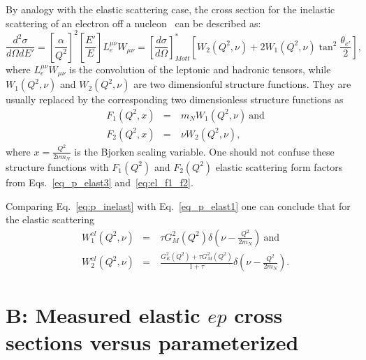 By analogy with the elastic scattering case, the cross section for the inelastic scattering of an electron off a nucleon~\cite{Halzen:1984mc,Close:1979bt,Povh:1995mua} can be described as:
\begin{equation}
\frac{d^{2}\sigma}{d\Omega d E'} = \left [\frac{\alpha}{Q^2}\right ]^{2} \left [\frac{E'}{E}\right ] L_{e}^{\mu \nu}W_{\mu \nu} =  \left [ \frac{d\sigma}{d\Omega} \right ]^{*}_{Mott}   \left [ W_{2}(Q^{2},\nu) + 2W_{1}(Q^{2},\nu)\tan^{2}{\frac{\theta_{e'}}{2}} \right ],\label{eq:p_inelast}
\end{equation}
where $L_{e}^{\mu \nu}W_{\mu \nu}$ is the convolution of the leptonic and hadronic tensors, while $W_{1}(Q^{2},\nu)$ and $W_{2}(Q^{2},\nu)$ are two dimensionful structure functions. They are usually replaced by the corresponding two dimensionless structure functions as
\begin{equation}
\begin{aligned}
&F_{1}(Q^{2},x) &=~& m_{N}W_{1}(Q^{2},\nu)~\textrm{and} \\
&F_{2}(Q^{2},x) &=~& \nu W_{2}(Q^{2}, \nu),
\label{eq:dimless_str_f}
\end{aligned}
\end{equation}
where $x=\frac{Q^{2}}{2 \nu m_{N}}$ is the Bjorken scaling variable. One should not confuse these structure functions with $F_{1}(Q^{2})$ and $F_{2}(Q^{2})$ elastic scattering form factors from Eqs.~\eqref{eq_p_elast3} and~\eqref{eq:el_f1_f2}.

Comparing Eq.~\eqref{eq:p_inelast} with Eq.~\eqref{eq_p_elast1} one can conclude that for the elastic scattering~\cite{Close:1979bt} 
\begin{equation}
\begin{aligned}
&W_{1}^{el}(Q^{2},\nu) &=~& \tau G_{M}^{2}(Q^{2})\delta\left ( \nu - \frac{Q^{2}}{2m_{N}} \right)~\textrm{and}  \\
&W_{2}^{el}(Q^{2},\nu) &=~& \frac{G_{E}^{2}(Q^{2}) + \tau G_{M}^{2}(Q^{2}) }{1+\tau} \delta\left ( \nu - \frac{Q^{2}}{2m_{N}} \right).
\label{eq:rel_str_fun}
\end{aligned}
\end{equation}


\newpage

\setcounter{table}{0}
\renewcommand{\thetable}{B.\arabic{table}}

\renewcommand{\thesection}{B}
    \makeatletter
   \renewcommand{\theequation}{\thesection.\@arabic\c@equation}
    \makeatother
\section*{B: Measured elastic $ep$ cross sections versus parameterized}
\label{app_epelas}




